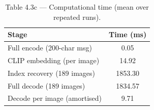 \begin{table}[htbp]
\centering
\caption{Table 4.3c — Computational time (mean over repeated runs).}
\label{tab:table_4_3_timing}
\begin{tabular}{lc}
\hline
Stage & Time (ms) \\
\hline
Full encode (200-char msg) & 0.05 \\
CLIP embedding (per image) & 14.92 \\
Index recovery (189 images) & 1853.30 \\
Full decode (189 images) & 1834.57 \\
Decode per image (amortised) & 9.71 \\
\hline
\end{tabular}
\end{table}
